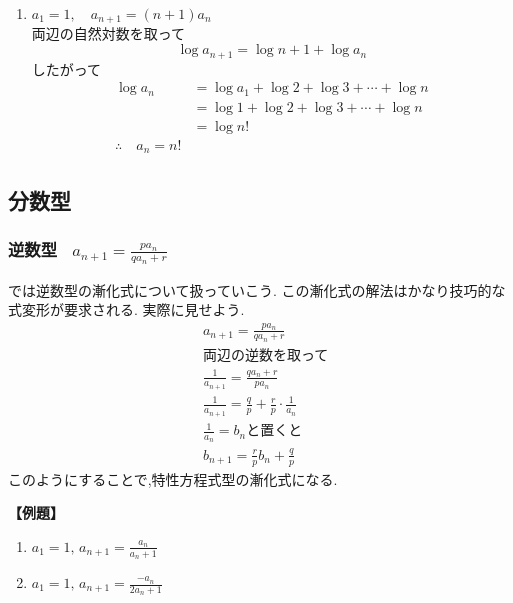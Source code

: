 \documentclass[dvipdfmx,a4paper,11pt,fleqn,openany]{jsbook}
\begin{document}
\begin{enumerate}[label=(\arabic*),parsep=3pt]
\[            \]
            $c_1=3$より,
            \begin{align*}
              &c_n=3\cdot2^{n-1}\\
              &b_n+2=3\cdot2^{n-1}\\
              &a_n=3^{3\cdot2^{n-1}-2}
            \end{align*}
      \item $\displaystyle a_1=1,\quad a_{n+1}=(n+1)a_n$\\
            両辺の自然対数を取って
            \[
              \log a_{n+1}=\log{n+1}+\log a_n
            \]
            したがって
            \begin{align*}
              \log a_n&=\log a_1 + \log{2}+\log{3}+\cdots+ \log{n}\\
              &=\log 1 + \log{2}+\log{3}+\cdots +\log{n}\\
              &=\log n!\\
              \therefore \quad a_n=n!
            \end{align*}
    \end{enumerate}

  \subsection{分数型}
    \subsubsection{逆数型  \, $\displaystyle a_{n+1}=\frac{pa_n}{qa_n+r}$}
      では逆数型の漸化式について扱っていこう.
      この漸化式の解法はかなり技巧的な式変形が要求される.
      実際に見せよう.
      \begin{align*}
        &a_{n+1}=\frac{pa_n}{qa_n+r}\\
        &\text{両辺の逆数を取って}\\
        &\frac{1}{a_{n+1}}=\frac{qa_n+r}{pa_n}\\
        &\frac{1}{a_{n+1}}=\frac{q}{p}+\frac{r}{p}\cdot\frac{1}{a_n}\\
        &\text{$\displaystyle \frac{1}{a_n}=b_n$と置くと}\\
        &b_{n+1}=\frac{r}{p}b_n+\frac{q}{p}
      \end{align*}
      このようにすることで,特性方程式型の漸化式になる.

      \noindent \textbf{【例題】}
      \begin{enumerate}[label=(\arabic*),parsep=3pt]
        \item $\displaystyle a_1=1,\, a_{n+1}=\frac{a_n}{a_n+1}$
        \item $\displaystyle a_1=1,\, a_{n+1}=\frac{-a_n}{2a_n+1}$
      \end{enumerate}
\end{document}
